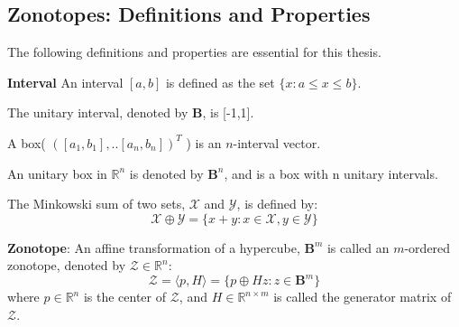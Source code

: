 \subsection{Zonotopes: Definitions and Properties}
The following definitions and properties are essential for this thesis.
\begin{definition}\textbf{Interval} An interval $[a,b]$ is defined as the set $\{x : a \leq x \leq b\}$.
\begin{subdefinition}
The unitary interval, denoted by $\textbf{B}$, is [-1,1].
\end{subdefinition}
\begin{subdefinition}
A box( $( [a_1, b_1],..[a_n, b_n] )^T$ ) is an $n$-interval vector.
\end{subdefinition}
\begin{subdefinition}
An unitary box in $\mathbb{R}^n$ is denoted by $\textbf{B}^n$, and is a box with n unitary intervals.
\end{subdefinition}
\end{definition}
\begin{definition}
The Minkowski sum of two sets, $\mathcal{X}$ and $\mathcal{Y}$, is defined by: 
\begin{equation}
\mathcal{X} \oplus \mathcal{Y} = \{x+ y: x \in \mathcal{X}, y \in \mathcal{Y}\}
\end{equation}
\end{definition}
\begin{definition}
\textbf{Zonotope}:
An affine transformation of a hypercube, $\textbf{B}^m$ is called an $m$-ordered zonotope, denoted by $\mathcal{Z}\in \mathbb{R}^n$:\\
\begin{equation}
\mathcal{Z} = \langle p, H \rangle = \{p \oplus Hz: z \in \textbf{B}^m\}
\end{equation}
where $p \in \mathbb{R}^n$ is the center of $\mathcal{Z}$, and $H \in \mathbb{R}^{n \times m}$ is called the generator matrix of $\mathcal{Z}$.
\end{definition}

